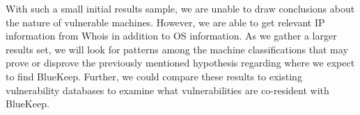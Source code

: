 With such a small initial results sample, we are unable to draw conclusions about the nature of vulnerable machines. However, we are able to get relevant IP information from Whois in addition to OS information. As we gather a larger results set, we will look for patterns among the machine classifications that may prove or disprove the previously mentioned hypothesis regarding where we expect to find BlueKeep. Further, we could compare these results to existing vulnerability databases to examine what vulnerabilities are co-resident with BlueKeep.